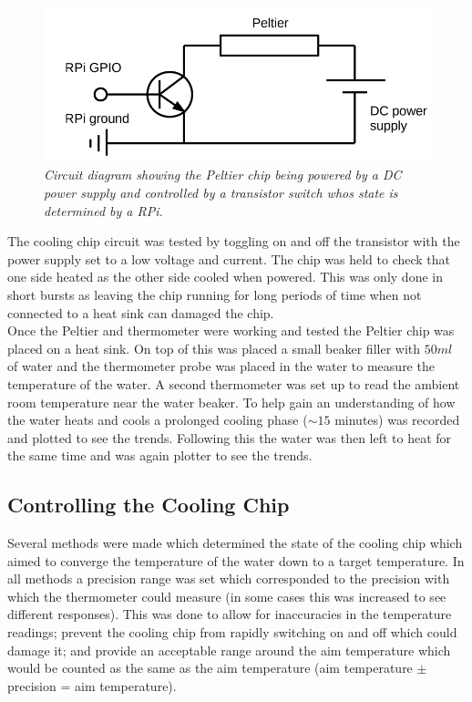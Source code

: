 \documentclass[10pt]{article}
\begin{document}
\begin{figure}[h!]
    \centering
    \includegraphics[scale=0.5]{circuit.png}
    \caption{\it{Circuit diagram showing the Peltier chip being powered by a DC power supply and controlled by a transistor switch whos state is determined by a RPi\cite{course_notes}.}}
    \label{fig:circuit}
\end{figure}

The cooling chip circuit was tested by toggling on and off the transistor with the power supply set to a low voltage and current. The chip was held to check that one side heated as the other side cooled when powered. This was only done in short bursts as leaving the chip running for long periods of time when not connected to a heat sink can damaged the chip. \\

Once the Peltier and thermometer were working and tested the Peltier chip was placed on a heat sink. On top of this was placed a small beaker filler with $50ml$ of water and the thermometer probe was placed in the water to measure the temperature of the water. A second thermometer was set up to read the ambient room temperature near the water beaker. To help gain an understanding of how the water heats and cools a prolonged cooling phase ($\sim15$ minutes) was recorded and plotted to see the trends. Following this the water was then left to heat for the same time and was again plotter to see the trends.



\subsection*{Controlling the Cooling Chip}
Several methods were made which determined the state of the cooling chip which aimed to converge the temperature of the water down to a target temperature. In all methods a precision range was set which corresponded to the precision with which the thermometer could measure (in some cases this was increased to see different responses). This was done to allow for inaccuracies in the temperature readings; prevent the cooling chip from rapidly switching on and off which could damage it; and provide an acceptable range around the aim temperature which would be counted as the same as the aim temperature (aim temperature $\pm$ precision = aim temperature).\\
\end{document}

